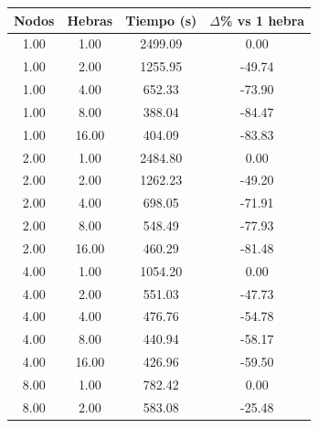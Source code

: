 \begin{table}[ht]
    \centering
    \begin{tabular}{|c|c|c|c|}
        \hline
        \textbf{Nodos} & \textbf{Hebras} & \textbf{Tiempo (s)} & \textbf{$\Delta$\% vs 1 hebra} \\
        \hline
        1.00           & 1.00            & 2499.09             & 0.00                           \\
        1.00           & 2.00            & 1255.95             & -49.74                         \\
        1.00           & 4.00            & 652.33              & -73.90                         \\
        1.00           & 8.00            & 388.04              & -84.47                         \\
        1.00           & 16.00           & 404.09              & -83.83                         \\
        2.00           & 1.00            & 2484.80             & 0.00                           \\
        2.00           & 2.00            & 1262.23             & -49.20                         \\
        2.00           & 4.00            & 698.05              & -71.91                         \\
        2.00           & 8.00            & 548.49              & -77.93                         \\
        2.00           & 16.00           & 460.29              & -81.48                         \\
        4.00           & 1.00            & 1054.20             & 0.00                           \\
        4.00           & 2.00            & 551.03              & -47.73                         \\
        4.00           & 4.00            & 476.76              & -54.78                         \\
        4.00           & 8.00            & 440.94              & -58.17                         \\
        4.00           & 16.00           & 426.96              & -59.50                         \\
        8.00           & 1.00            & 782.42              & 0.00                           \\
        8.00           & 2.00            & 583.08              & -25.48                         \\

\end{tabular}
\end{table}
